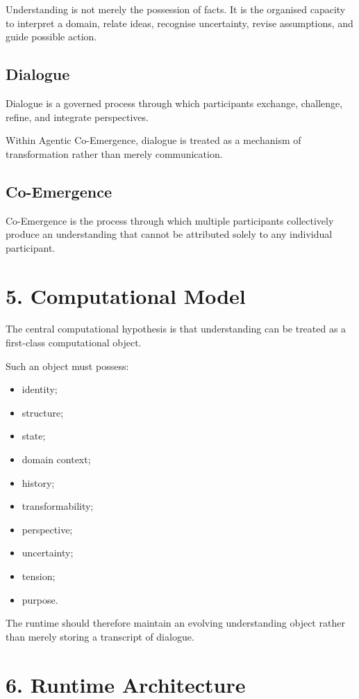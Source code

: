Understanding is not merely the possession of facts. It is the organised capacity to interpret a domain, relate ideas, recognise uncertainty, revise assumptions, and guide possible action.

\subsection*{Dialogue}

Dialogue is a governed process through which participants exchange, challenge, refine, and integrate perspectives.

Within Agentic Co-Emergence, dialogue is treated as a mechanism of transformation rather than merely communication.

\subsection*{Co-Emergence}

Co-Emergence is the process through which multiple participants collectively produce an understanding that cannot be attributed solely to any individual participant.

\section*{5. Computational Model}

The central computational hypothesis is that understanding can be treated as a first-class computational object.

Such an object must possess:

\begin{itemize}
\item identity;
\item structure;
\item state;
\item domain context;
\item history;
\item transformability;
\item perspective;
\item uncertainty;
\item tension;
\item purpose.
\end{itemize}

The runtime should therefore maintain an evolving understanding object rather than merely storing a transcript of dialogue.

\section*{6. Runtime Architecture}

